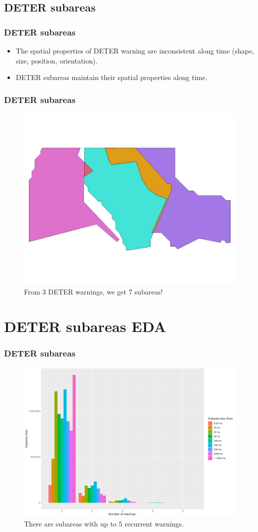\documentclass[aspectratio=169]{beamer}
\begin{document}
\subsection{DETER subareas}

\begin{frame}
    \frametitle{DETER subareas}
    \begin{itemize}
        \item The spatial properties of DETER warning are inconsistent along 
            time (shape, size, position, orientation).
        \item DETER subareas maintain their spatial properties along time.
    \end{itemize}
\end{frame}

\begin{frame}
    \frametitle{DETER subareas}
    \begin{figure}[h] 
        \includegraphics[width=0.60\linewidth]
        {./images/sample_deter_subareas.png}
        \caption{From 3 DETER warnings, we get 7 subareas!}
        \label{fig:deter_subareas}
    \end{figure}
\end{frame}





\section{DETER subareas EDA}

\begin{frame}
    \frametitle{DETER subareas}
    \begin{figure}[h] 
        \includegraphics[width=0.65\linewidth]
        {./figures/plot_deter_subarea_by_nwarnings.png}
        \caption{There are subareas with up to 5 recurrent warnings.}
        \label{fig:deter_subareas_nwarnings}
    \end{figure}
\end{frame}
\end{document}
